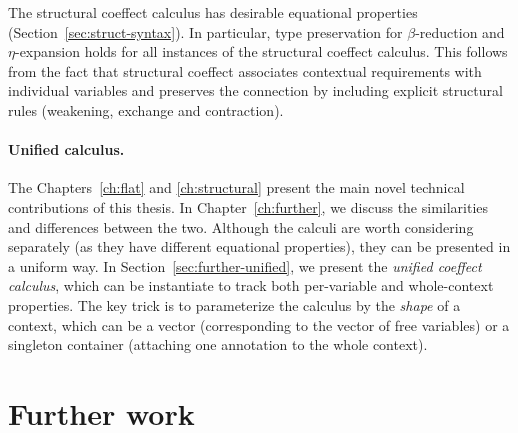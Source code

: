 The structural coeffect calculus has desirable equational properties (Section~\ref{sec:struct-syntax}).
In particular, type preservation for $\beta$-reduction and $\eta$-expansion holds for all instances of the
structural coeffect calculus. This follows from the fact that structural coeffect
associates contextual requirements with individual variables and preserves the connection by
including explicit structural rules (weakening, exchange and contraction).


\paragraph{Unified calculus.}

The Chapters~\ref{ch:flat} and \ref{ch:structural} present the main novel technical contributions of this
thesis. In Chapter~\ref{ch:further}, we discuss the similarities and differences between the two.
Although the calculi are worth considering separately (as they have different equational properties),
they can be presented in a uniform way. In Section~\ref{sec:further-unified}, we present the
\emph{unified coeffect calculus}, which can be instantiate to track both per-variable and
whole-context properties. The key trick is to parameterize the calculus by the \emph{shape} of
a context, which can be a vector (corresponding to the vector of free variables) or a singleton
container (attaching one annotation to the whole context).

%
%

\section{Further work}
\label{sec:conc-further}

